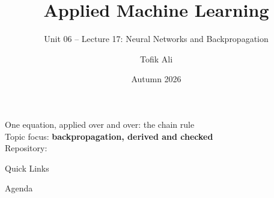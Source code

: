 \documentclass[aspectratio=169]{beamer}
\title[Applied Machine Learning]{Applied Machine Learning}
\subtitle{Unit 06 -- Lecture 17: Neural Networks and Backpropagation}
\author{Tofik Ali}
\institute{School of Computer Science, UPES Dehradun}
\date{Autumn 2026}
\begin{document}
\UPESCoverFrame
\setcounter{framenumber}{0}

\begin{frame}
  \titlepage
  \begin{center}
    \footnotesize One equation, applied over and over: the chain rule\\[0.25em]
    \footnotesize Topic focus: \textbf{backpropagation, derived and checked}\\[0.25em]
    \footnotesize Repository: \texttt{\AMLRepoURL}
  \end{center}
  \slidesources{\AMLUnitVISources}
\end{frame}

\begin{frame}{Quick Links}
  \centering
  \hyperlink{sec:perc}{}\hspace{0.4em}
  \hyperlink{sec:xor}{}\hspace{0.4em}
  \hyperlink{sec:act}{}\hspace{0.4em}
  \hyperlink{sec:bp}{}\\[0.6em]
  \hyperlink{sec:mlp}{}\hspace{0.4em}
  \hyperlink{sec:init}{}\hspace{0.4em}
  \hyperlink{sec:rnn}{}\hspace{0.4em}
  \hyperlink{sec:summary}{}
\end{frame}

\begin{frame}{Agenda}
  \tableofcontents
\end{frame}
\end{document}
